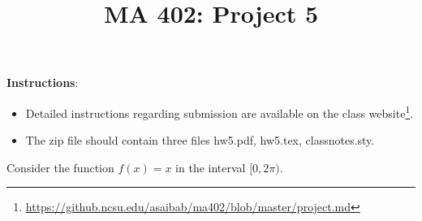 \documentclass[10pt]{exam}
\title{MA 402: Project 5}
\date{}
\newcommand{\changes}[1]{{\color{red} #1}}
\begin{document}
\maketitle
\textbf{Instructions}: 

\begin{itemize}
\item Detailed instructions regarding submission are available on the class website\footnote{\url{https://github.ncsu.edu/asaibab/ma402/blob/master/project.md}}.
\item The zip file should contain three files hw5.pdf, hw5.tex, classnotes.sty. 

\end{itemize}

\vspace{2mm}

\begin{questions}

\question [20] Consider the function \changes{$f(x) = x$} in the interval $[0,2\pi)$. 
\end{questions}
\end{document}
